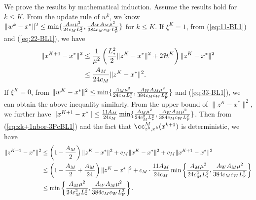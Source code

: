 \documentclass[11pt]{article}
\begin{document}
	We prove the results by mathematical induction. Assume the results hold for $k\leq K$. From the update rule of $w^k$, we know $\|w^k - x^*\|^2 \leq \min\{  \frac{A_M \mu^2}{24c_M L_{*}^2}, \frac{A_WA_M \mu^2}{384c_Mc_WL_{\rm F}^2}  \}$ for $k\leq K$. If $\xi^K=1$, from (\ref{eq:11-BL1}) and (\ref{eq:22-BL1}), we have 
	\begin{align}
		\|x^{K+1} - x^*\|^2 & \leq \frac{1}{\mu^2} \left(  \frac{L_{*}^2}{2} \|z^K-x^*\|^2 + 2{\cal H}^K  \right) \|z^K-x^*\|^2 \label{eq:xk+1-3PcBL1} \\ 
		& \leq \frac{A_M}{24c_M} \|z^K-x^*\|^2. \nonumber
	\end{align}
	If $\xi^K=0$, from $\|w^K - x^*\|^2 \leq  \min\{  \frac{A_M \mu^2}{24c_M L_{*}^2}, \frac{A_WA_M \mu^2}{384c_Mc_WL_{\rm F}^2}  \}$ and (\ref{eq:33-BL1}), we can obtain the above inequality similarly. From the upper bound of $\|z^K-x^*\|^2$, we further have $\|x^{K+1} -x^*\| \leq \frac{11A_M}{24c_M} \min\{  \frac{A_M \mu^2}{24c_M^2 L_{*}^2}, \frac{A_WA_M \mu^2}{384c_Mc_WL_{\rm F}^2}  \}$. Then from (\ref{eq:zk+1nbor-3PcBL1}) and the fact that $\cc^M_{z^k, x^k}(x^{k+1})$ is deterministic, we have 
	\begin{align*}
		\|z^{K+1}-x^*\|^2 & \leq \left(  1 - \frac{A_M}{2}  \right) \|z^K-x^*\|^2 + c_M\|x^K-x^*\|^2 + c_M\|x^{K+1}-x^*\|^2 \\ 
		& \leq \left(   1 - \frac{A_M}{2}  + \frac{A_M}{24}  \right) \|z^K-x^*\|^2 + c_M \cdot  \frac{11A_M}{24c_M} \min\left\{  \frac{A_M \mu^2}{24c_M^2 L_{*}^2}, \frac{A_WA_M \mu^2}{384c_Mc_WL_{\rm F}^2}  \right\} \\ 
		& \leq \min\left\{  \frac{A_M \mu^2}{24c_M^2 L_{*}^2}, \frac{A_WA_M \mu^2}{384c_Mc_WL_{\rm F}^2}  \right\}. 
	\end{align*}
	
\end{document}
